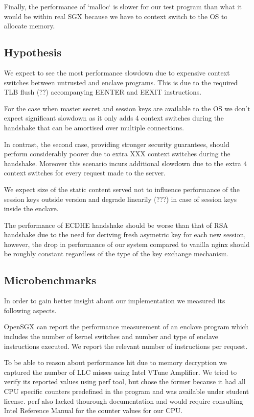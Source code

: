 \documentclass[../main.tex]{subfiles}
\begin{document}
Finally, the performance of `malloc` is slower for our test program than what
it would be within real SGX because we have to context switch to the OS to
allocate memory.

\subsection{Hypothesis}
We expect to see the most performance slowdown due to expensive context
switches between untrusted and enclave programs. This is due to the required
TLB flush (??) accompanying EENTER and EEXIT instructions.

For the case when master secret and session keys are available to the OS we
don't expect significant slowdown as it only adds 4 context switches during
the handshake that can be amortised over multiple connections.

In contrast, the second case, providing stronger security guarantees, should
perform considerably poorer due to extra XXX context switches during the
handshake. Moreover this scenario incurs additional slowdown due to the extra
4 context switches for every request made to the server.

We expect size of the static content served not to influence performance of
the session keys outside version and degrade linearily (???) in case of
session keys inside the enclave.

The performance of ECDHE handshake should be worse than that of RSA handshake
due to the need for deriving fresh asymetric key for each new session,
however, the drop in performance of our system compared to vanilla nginx
should be roughly constant regardless of the type of the key exchange
mechanism.

\subsection{Microbenchmarks}
In order to gain better insight about our implementation we measured its
following aspects.

OpenSGX can report the performance measurement of an enclave program which
includes the number of kernel switches and number and type of enclave
instructions executed. We report the relevant number of instructions per
request.

To be able to reason about performance hit due to memory decryption we
captured the number of LLC misses using Intel VTune Amplifier. We tried to
verify its reported values using perf tool, but chose the former because it
had all CPU specific counters predefined in the program and was available
under student license. perf also lacked thourough documentation and would
require consulting Intel Reference Manual for the counter values for our CPU.
 
\end{document}
